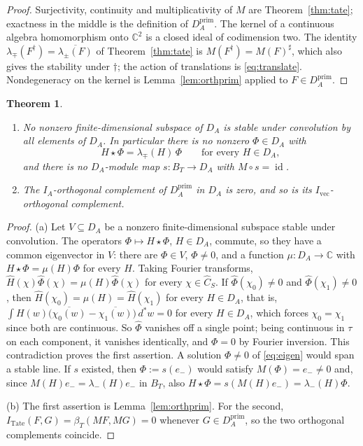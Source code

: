 \documentclass[11pt]{amsart}
\newtheorem{theorem}{Theorem}[section]
\theoremstyle{definition}
\theoremstyle{remark}
\newcommand{\C}{\mathbb C}
\newcommand{\dstar}{\,d^{*}}
\newcommand{\id}{\operatorname{id}}
\newcommand{\Ch}{\widehat{C}_S}
\newcommand{\DA}{D_A}
\newcommand{\BT}{B_T}
\begin{document}
\begin{proof}
Surjectivity, continuity and multiplicativity of $M$ are
Theorem~\ref{thm:tate}; exactness
in the middle is the definition of $\DA^{\mathrm{prim}}$.  The kernel of a
continuous algebra homomorphism onto $\C^{2}$ is a closed ideal of codimension
two.  The identity
$\lambda_{\mp}(F^{\dagger})=\overline{\lambda_{\pm}(F)}$ of
Theorem~\ref{thm:tate} is $M(F^{\dagger})=M(F)^{\sharp}$, which also gives the
stability under $\dagger$; the action of translations is
\eqref{eq:translate}.  Nondegeneracy on the kernel is
Lemma~\ref{lem:orthprim} applied to $F\in\DA^{\mathrm{prim}}$.
\end{proof}

\begin{theorem}\label{thm:nosplit}
\begin{enumerate}
\item[(a)] No nonzero finite-dimensional subspace of $\DA$ is stable under
convolution by all elements of $\DA$.  In particular there is no nonzero
$\Phi\in\DA$ with
\begin{equation}\label{eq:eigen}
H\star\Phi=\lambda_{\mp}(H)\,\Phi\qquad\text{for every }H\in\DA ,
\end{equation}
and there is no $\DA$-module map $s:\BT\to\DA$ with $M\circ s=\id$.
\item[(b)] The $I_A$-orthogonal complement of $\DA^{\mathrm{prim}}$ in $\DA$ is
zero, and so is its $I_{\mathrm{vec}}$-orthogonal complement.
\end{enumerate}
\end{theorem}

\begin{proof}
(a)  Let $V\subseteq\DA$ be a nonzero finite-dimensional subspace stable under
convolution.  The operators $\Phi\mapsto H\star\Phi$, $H\in\DA$, commute, so
they have a common eigenvector in $V$: there are $\Phi\in V$, $\Phi\ne0$, and
a function $\mu:\DA\to\C$ with $H\star\Phi=\mu(H)\Phi$ for every $H$.  Taking
Fourier transforms, $\widehat H(\chi)\widehat\Phi(\chi)=
\mu(H)\widehat\Phi(\chi)$ for every $\chi\in\Ch$.  If
$\widehat\Phi(\chi_0)\ne0$ and $\widehat\Phi(\chi_1)\ne0$, then
$\widehat H(\chi_0)=\mu(H)=\widehat H(\chi_1)$ for every $H\in\DA$, that is,
$\int H(w)\bigl(\overline{\chi_0(w)}-\overline{\chi_1(w)}\bigr)\dstar w=0$ for
every $H\in\DA$, which forces $\chi_0=\chi_1$ since both are continuous.  So
$\widehat\Phi$ vanishes off a single point; being continuous in $\tau$ on each
component, it vanishes identically, and $\Phi=0$ by Fourier inversion.  This
contradiction proves the first assertion.  A solution $\Phi\ne0$ of
\eqref{eq:eigen} would span a stable line.  If $s$ existed, then
$\Phi:=s(e_-)$ would satisfy $M(\Phi)=e_-\ne0$ and, since
$M(H)e_-=\lambda_-(H)e_-$ in $\BT$, also
$H\star\Phi=s(M(H)e_-)=\lambda_-(H)\Phi$.

(b)  The first assertion is Lemma~\ref{lem:orthprim}.  For the second,
$I_{\mathrm{Tate}}(F,G)=\beta_T(MF,MG)=0$ whenever
$G\in\DA^{\mathrm{prim}}$, so the two orthogonal complements coincide.
\end{proof}
\end{document}
